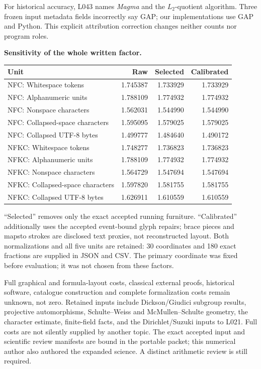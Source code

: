 \documentclass[11pt,a4paper]{article}
\begin{document}
For historical accuracy, L043 names \emph{Magma} and the \(L_2\)-quotient algorithm. Three frozen input metadata fields incorrectly say GAP; our implementations use GAP and Python. This explicit attribution correction changes neither counts nor program roles.

\textbf{Sensitivity of the whole written factor.}
\begin{center}\small\begin{tabular}{lrrr}\toprule
Unit & Raw & Selected & Calibrated\\\midrule
NFC: Whitespace tokens & 1.745387 & 1.733929 & 1.733929\\
NFC: Alphanumeric units & 1.788109 & 1.774932 & 1.774932\\
NFC: Nonspace characters & 1.562031 & 1.544990 & 1.544990\\
NFC: Collapsed-space characters & 1.595095 & 1.579025 & 1.579025\\
NFC: Collapsed UTF-8 bytes & 1.499777 & 1.484640 & 1.490172\\
NFKC: Whitespace tokens & 1.748277 & 1.736823 & 1.736823\\
NFKC: Alphanumeric units & 1.788109 & 1.774932 & 1.774932\\
NFKC: Nonspace characters & 1.564729 & 1.547694 & 1.547694\\
NFKC: Collapsed-space characters & 1.597820 & 1.581755 & 1.581755\\
NFKC: Collapsed UTF-8 bytes & 1.626911 & 1.610559 & 1.610559\\
\bottomrule\end{tabular}\end{center}
``Selected'' removes only the exact accepted running furniture. ``Calibrated'' additionally uses the accepted event-bound glyph repairs; brace pieces and mapsto strokes are disclosed text proxies, not reconstructed layout. Both normalizations and all five units are retained: 30 coordinates and 180 exact fractions are supplied in JSON and CSV. The primary coordinate was fixed before evaluation; it was not chosen from these factors.

Full graphical and formula-layout costs, classical external proofs, historical software, catalogue construction and complete formalization costs remain unknown, not zero. Retained inputs include Dickson/Giudici subgroup results, projective automorphisms, Schulte--Weiss and McMullen--Schulte geometry, the character estimate, finite-field facts, and the Dirichlet/Suzuki inputs to L021. Full costs are not silently supplied by another topic. The exact accepted input and scientific review manifests are bound in the portable packet; this numerical author also authored the expanded science. A distinct arithmetic review is still required.
\end{document}
